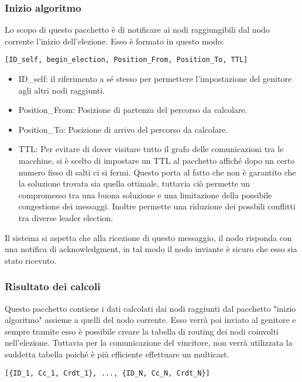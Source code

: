\subsubsection{Inizio algoritmo}
Lo scopo di questo pacchetto è di notificare ai nodi raggiungibili dal nodo corrente l'inizio dell'elezione. Esso è formato in questo modo:

\begin{lstlisting}
[ID_self, begin_election, Position_From, Position_To, TTL]
\end{lstlisting}

\begin{itemize}
	\item ID\_self: il riferimento a sé stesso per permettere l'impostazione del genitore agli altri nodi raggiunti.
	\item Position\_From: Posizione di partenza del percorso da calcolare.
	\item Position\_To: Posizione di arrivo del percorso da calcolare.
	\item TTL: Per evitare di dover visitare tutto il grafo delle comunicazioni tra le macchine, si è scelto di impostare un TTL al pacchetto affiché dopo un certo numero fisso di salti ci si fermi. Questo porta al fatto che non è garantito che la soluzione trovata sia quella ottimale, tuttavia ciò permette un compromesso tra una buona soluzione e una limitazione della possibile congestione dei messaggi. Inoltre permette una riduzione dei possbili conflitti tra diverse leader election.
\end{itemize}

Il sistema si aspetta che alla ricezione di questo messaggio, il nodo risponda con una notifica di acknowledgment, in tal modo il nodo inviante è sicuro che esso sia stato ricevuto.

\subsubsection{Risultato dei calcoli} \label{pacchetto_calcolato}
Questo pacchetto contiene i dati calcolati dai nodi raggiunti dal pacchetto "inizio algoritmo" assieme a quelli del nodo corrente. Esso verrà poi inviato al genitore e sempre tramite esso è possibile creare la tabella di routing dei nodi coinvolti nell'elezione. Tuttavia per la comunicazione del vincitore, non verrà utilizzata la suddetta tabella poiché è più efficiente effettuare un multicast.

\begin{lstlisting} 
[{ID_1, Cc_1, Crdt_1}, ..., {ID_N, Cc_N, Crdt_N}]
\end{lstlisting}

